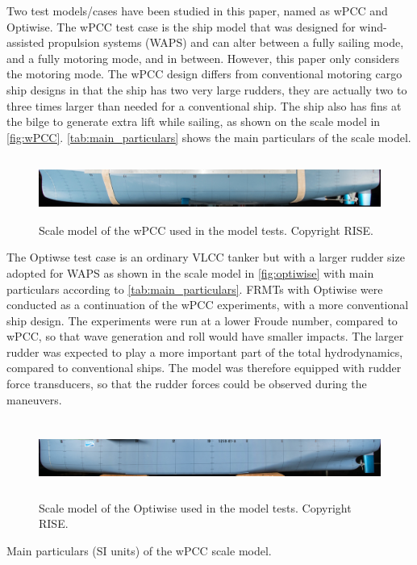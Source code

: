 \noindent Two test models/cases have been studied in this paper, named as wPCC and Optiwise. The wPCC test case is the ship model that was designed for wind-assisted propulsion systems (WAPS) and can alter between a fully sailing mode, and a fully motoring mode, and in between. 
However, this paper only considers the motoring mode. The wPCC design differs from conventional motoring cargo ship designs in that the ship has two very large rudders, they are actually two to three times larger than needed for a conventional ship. The ship also has fins at the bilge to generate extra lift while sailing, as shown on the scale model in \autoref{fig:wPCC}.
\autoref{tab:main_particulars} shows the main particulars of the scale model. 

\begin{figure}[h]
    \centering
    \includegraphics[width=\columnwidth, height = 0.8in]{figures/5m2.jpg}
    \caption{Scale model of the wPCC used in the model tests. Copyright RISE.}
    \label{fig:wPCC}
\end{figure}

The Optiwse test case is an ordinary VLCC tanker but with a larger rudder size adopted for WAPS as shown in the scale model in \autoref{fig:optiwise} with main particulars according to \autoref{tab:main_particulars}.
FRMTs with Optiwise were conducted as a continuation of the wPCC experiments, with a more conventional ship design. The experiments were run at a lower Froude number, compared to wPCC, so that wave generation and roll would have smaller impacts. The larger rudder was expected to play a more important part of the total hydrodynamics, compared to conventional ships. The model was therefore equipped with rudder force transducers, so that the rudder forces could be observed during the maneuvers. 
\begin{figure}[h]
    \centering
    \includegraphics[width=\columnwidth, height = 1in]{figures/optiwise.jpg}
    \caption{Scale model of the Optiwise used in the model tests. Copyright RISE.}
    \label{fig:optiwise}
\end{figure}
\begin{table}[h]
    \centering
    \caption{Main particulars (SI units) of the wPCC scale model.}
    \label{tab:main_particulars}
\end{table}